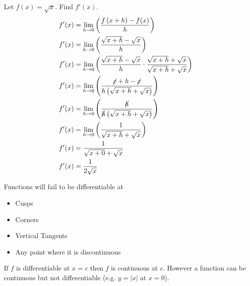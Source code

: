 \begin{example}
    Let $f(x) = \sqrt{x}$. Find $f'(x)$.
    \begin{align*}
        f'(x) &= \lim_{h \to 0}\left( \dfrac{f\left(x + h\right) - f(x)}{h} \right) \\
        f'(x) &= \lim_{h \to 0}\left( \dfrac{\sqrt{x + h} - \sqrt{x}}{h} \right)\\
        f'(x) &= \lim_{h \to 0}\left( \dfrac{\sqrt{x + h} - \sqrt{x}}{h} \cdot \dfrac{\sqrt{x+h} + \sqrt{x}}{\sqrt{x+h} + \sqrt{x}} \right)\\
        f'(x) &= \lim_{h \to 0}\left( \dfrac{\cancel{x} + h - \cancel{x}}{h \left(\sqrt{x + h} + \sqrt{x}\right)} \right)\\
        f'(x) &= \lim_{h \to 0}\left( \dfrac{\cancel{h}}{\cancel{h} \left(\sqrt{x + h} + \sqrt{x}\right)} \right)\\
        f'(x) &= \lim_{h \to 0}\left( \dfrac{1}{\sqrt{x + h} + \sqrt{x}} \right)\\
        f'(x) &= \dfrac{1}{\sqrt{x + 0} + \sqrt{x}}\\
        f'(x) &= \dfrac{1}{2\sqrt{x}}\\
    \end{align*}
\end{example}
\begin{corollary}
    Functions will fail to be differentiable at
    \begin{itemize}
        \item Cusps
        \item Corners
        \item Vertical Tangents
        \item Any point where it is discontinuous
    \end{itemize}
\end{corollary}
\begin{lemma}
    If $f$ is differentiable at $x=c$ then $f$ is continuous at $c$. However a function can be continuous but not differentiable (e.g. $y=\left|x\right|$ at $x=0$).
\end{lemma}
